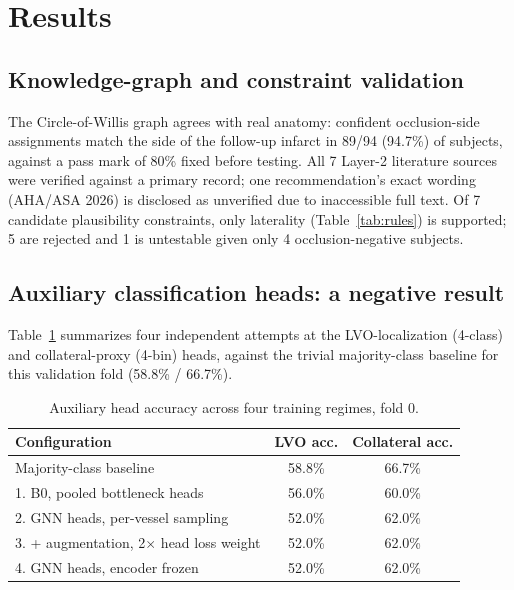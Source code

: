 \documentclass[conference]{IEEEtran}
\begin{document}
\section{Results}

\subsection{Knowledge-graph and constraint validation}
The Circle-of-Willis graph agrees with real anatomy: confident occlusion-side assignments match the side of the follow-up infarct in 89/94 (94.7\%) of subjects, against a pass mark of 80\% fixed before testing. All 7 Layer-2 literature sources were verified against a primary record; one recommendation's exact wording (AHA/ASA 2026) is disclosed as unverified due to inaccessible full text. Of 7 candidate plausibility constraints, only laterality (Table~\ref{tab:rules}) is supported; 5 are rejected and 1 is untestable given only 4 occlusion-negative subjects.

\subsection{Auxiliary classification heads: a negative result}
\label{sec:heads}
Table~\ref{tab:heads} summarizes four independent attempts at the LVO-localization (4-class) and collateral-proxy (4-bin) heads, against the trivial majority-class baseline for this validation fold (58.8\% / 66.7\%).

\begin{table}[t]
\centering
\caption{Auxiliary head accuracy across four training regimes, fold 0.}
\label{tab:heads}
\begin{tabular}{lcc}
\toprule
\textbf{Configuration} & \textbf{LVO acc.} & \textbf{Collateral acc.} \\
\midrule
Majority-class baseline & 58.8\% & 66.7\% \\
1. B0, pooled bottleneck heads & 56.0\% & 60.0\% \\
2. GNN heads, per-vessel sampling & 52.0\% & 62.0\% \\
3. + augmentation, 2$\times$ head loss weight & 52.0\% & 62.0\% \\
4. GNN heads, encoder frozen & 52.0\% & 62.0\% \\
\bottomrule
\end{tabular}
\end{table}
\end{document}
